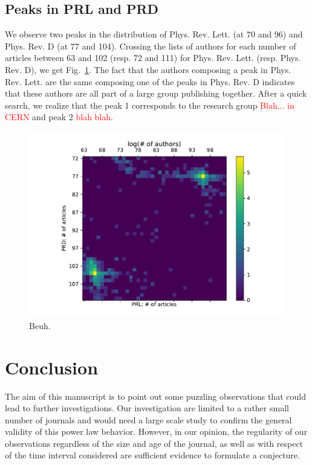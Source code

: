 \documentclass[aps,prl,floatfix,twocolumn]{revtex4-1}
\begin{document}
\subsection{Peaks in PRL and PRD}
We observe two peaks in the distribution of Phys. Rev. Lett. (at 70 and 96) and Phys. Rev. D (at 77 and 104). 
Crossing the lists of authors for each number of articles between 63 and 102 (resp. 72 and 111) for Phys. Rev. Lett. (resp. Phys. Rev. D), we get Fig.~\ref{fig:prl_prd}. 
The fact that the authors composing a peak in Phys. Rev. Lett. are the same composing one of the peaks in Phys. Rev. D indicates that these authors are all part of a large group publishing together. 
After a quick search, we realize that the peak 1 corresponds to the research group \textcolor{red}{Blah... in CERN} and peak 2 \textcolor{red}{blah blah}.
\begin{figure}
 \centering
 \includegraphics[width=.8\columnwidth]{figures/prl_prd_log.pdf}
 \caption{Beuh.}
 \label{fig:prl_prd}
\end{figure}


\section{Conclusion}
The aim of this manuscript is to point out some puzzling observations that could lead to further investigations. 
Our investigation are limited to a rather small number of journals and would need a large scale study to confirm the general validity of this power law behavior. 
However, in our opinion, the regularity of our observations regardless of the size and age of the journal, 
as well as with respect of the time interval considered are sufficient evidence to formulate a conjecture. 




\end{document}
